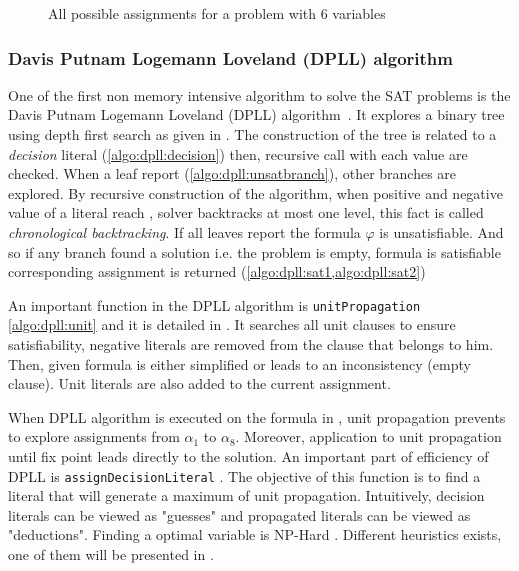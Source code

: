 \begin{figure}[H]
	\centering
	
	\caption{All possible assignments for a problem with 6 variables}
	\label{fig:naive_algo}
\end{figure}


\subsubsection{Davis Putnam Logemann Loveland (DPLL) algorithm}

One of the first non memory intensive algorithm to solve the SAT problems is 
the Davis Putnam Logemann Loveland (DPLL) algorithm~\cite{dpll_62}. 
It explores a binary tree using depth first search as given in .
The construction of the tree is related to a \emph{decision} literal (\cref{algo:dpll:decision}) then,
recursive call with each value are checked.
When a leaf report \unsat (\cref{algo:dpll:unsatbranch}), other branches are explored.
By recursive construction of the algorithm, when positive and negative value of a literal reach \unsat,
solver backtracks at most one level, this fact is called \emph{chronological backtracking}.
If all leaves report \unsat the formula $\varphi$ is unsatisfiable.
And so  if any branch found a solution  i.e. the problem is empty,
formula is satisfiable corresponding assignment is returned (\cref{algo:dpll:sat1,algo:dpll:sat2})



An important function in the DPLL algorithm is \texttt{unitPropagation} \cref{algo:dpll:unit} and
it is detailed in . It searches all unit clauses to ensure satisfiability,
negative literals are removed from the clause that belongs to him. Then, given formula is either simplified
or leads to an inconsistency (empty clause). Unit literals are also added to the current assignment.



When DPLL algorithm is executed on the formula in , unit propagation prevents to 
explore assignments from $\alpha_1 $ to $\alpha_{8}$. Moreover, application to unit propagation until fix point
leads directly to the solution. 
An important part of efficiency of DPLL is \texttt{assignDecisionLiteral} . The objective of this function 
is to find a literal that will generate a maximum of unit propagation. Intuitively, decision literals 
can be viewed as "guesses" and propagated literals can be viewed as "deductions". Finding a optimal variable
is NP-Hard \cite{biere2009handbook}. Different heuristics exists, one of them will be presented in 
.



